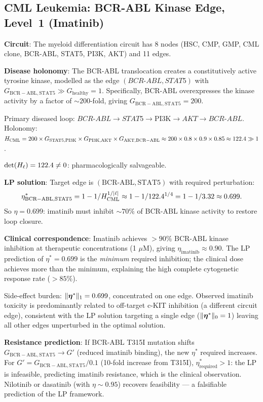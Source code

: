 \subsection{CML Leukemia: BCR-ABL Kinase Edge, Level~1 (Imatinib)}
\label{sec:case-cml}

\begin{example}
\label{ex:cml}
\textbf{Circuit}: The myeloid differentiation circuit has 8 nodes (HSC, CMP,
GMP, CML clone, BCR-ABL, STAT5, PI3K, AKT) and 11 edges.

\textbf{Disease holonomy}: The BCR-ABL translocation creates a constitutively
active tyrosine kinase, modelled as the edge $(BCR\text{-}ABL, STAT5)$ with
$G_{\mathrm{BCR-ABL,STAT5}} \gg G_{\mathrm{healthy}} = 1$.  Specifically,
BCR-ABL overexpresses the kinase activity by a factor of $\sim 200$-fold,
giving $G_{\mathrm{BCR-ABL,STAT5}} = 200$.

Primary diseased loop: $BCR\text{-}ABL \to STAT5 \to \text{PI3K} \to AKT
\to BCR\text{-}ABL$.  Holonomy: $H_{\mathrm{CML}} = 200 \times G_{\mathrm{STAT5,PI3K}}
\times G_{\mathrm{PI3K,AKT}} \times G_{\mathrm{AKT,BCR-ABL}} \approx 200 \times
0.8 \times 0.9 \times 0.85 \approx 122.4 \gg 1$.

$\det(H_\ell) = 122.4 \neq 0$: pharmacologically salvageable.

\textbf{LP solution}: Target edge is $(\mathrm{BCR}\text{-}\mathrm{ABL},
\mathrm{STAT5})$ with required perturbation:
\[
  \eta^*_{\mathrm{BCR-ABL,STAT5}}
  = 1 - 1/H_{\mathrm{CML}}^{1/|\ell|}
  \approx 1 - 1/122.4^{1/4}
  = 1 - 1/3.32
  \approx 0.699.
\]
So $\eta = 0.699$: imatinib must inhibit $\sim 70\%$ of BCR-ABL kinase
activity to restore loop closure.

\textbf{Clinical correspondence}: Imatinib achieves $> 90\%$ BCR-ABL kinase
inhibition at therapeutic concentrations (1 $\mu$M), giving $\eta_{\mathrm{imatinib}} \approx 0.90$.
The LP prediction of $\eta^* = 0.699$ is the \emph{minimum} required
inhibition; the clinical dose achieves more than the minimum, explaining
the high complete cytogenetic response rate ($> 85\%$).

Side-effect burden: $\|\boldsymbol{\eta}^*\|_1 = 0.699$, concentrated on one edge.
Observed imatinib toxicity is predominantly related to off-target c-KIT
inhibition (a different circuit edge), consistent with the LP solution
targeting a single edge ($\|\boldsymbol{\eta}^*\|_0 = 1$) leaving all other edges
unperturbed in the optimal solution.

\textbf{Resistance prediction}: If BCR-ABL T315I mutation shifts
$G_{\mathrm{BCR-ABL,STAT5}} \to G'$ (reduced imatinib binding), the
new $\eta^*$ required increases.  For $G' = G_{\mathrm{BCR-ABL,STAT5}} / 0.1$
(10-fold increase from T315I), $\eta_{\mathrm{required}}^* > 1$: the LP is
infeasible, predicting imatinib resistance, which is the clinical observation.
Nilotinib or dasatinib (with $\eta \sim 0.95$) recovers feasibility — a
falsifiable prediction of the LP framework.
\end{example}

